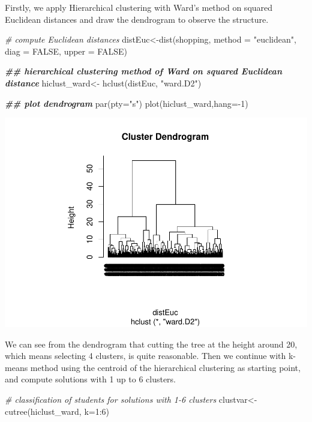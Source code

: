 \documentclass[
  11pt,
]{article}
\newenvironment{Shaded}{\begin{snugshade}}{\end{snugshade}}
\newcommand{\AttributeTok}[1]{\textcolor[rgb]{0.77,0.63,0.00}{#1}}
\newcommand{\CommentTok}[1]{\textcolor[rgb]{0.56,0.35,0.01}{\textit{#1}}}
\newcommand{\ConstantTok}[1]{\textcolor[rgb]{0.00,0.00,0.00}{#1}}
\newcommand{\DecValTok}[1]{\textcolor[rgb]{0.00,0.00,0.81}{#1}}
\newcommand{\DocumentationTok}[1]{\textcolor[rgb]{0.56,0.35,0.01}{\textbf{\textit{#1}}}}
\newcommand{\FunctionTok}[1]{\textcolor[rgb]{0.00,0.00,0.00}{#1}}
\newcommand{\NormalTok}[1]{#1}
\newcommand{\OtherTok}[1]{\textcolor[rgb]{0.56,0.35,0.01}{#1}}
\newcommand{\SpecialCharTok}[1]{\textcolor[rgb]{0.00,0.00,0.00}{#1}}
\newcommand{\StringTok}[1]{\textcolor[rgb]{0.31,0.60,0.02}{#1}}
\begin{document}
Firstly, we apply Hierarchical clustering with Ward's method on squared Euclidean distances and draw the dendrogram to observe the structure.

\begin{Shaded}
\begin{Highlighting}[]
\CommentTok{\# compute Euclidean distances}
\NormalTok{distEuc}\OtherTok{\textless{}{-}}\FunctionTok{dist}\NormalTok{(shopping, }\AttributeTok{method =} \StringTok{"euclidean"}\NormalTok{, }\AttributeTok{diag =} \ConstantTok{FALSE}\NormalTok{, }\AttributeTok{upper =} \ConstantTok{FALSE}\NormalTok{)}

\DocumentationTok{\#\#  hierarchical clustering method of Ward on squared Euclidean distance}
\NormalTok{hiclust\_ward}\OtherTok{\textless{}{-}} \FunctionTok{hclust}\NormalTok{(distEuc, }\StringTok{"ward.D2"}\NormalTok{)}

\DocumentationTok{\#\# plot dendrogram}
\FunctionTok{par}\NormalTok{(}\AttributeTok{pty=}\StringTok{"s"}\NormalTok{)}
\FunctionTok{plot}\NormalTok{(hiclust\_ward,}\AttributeTok{hang=}\SpecialCharTok{{-}}\DecValTok{1}\NormalTok{)}
\end{Highlighting}
\end{Shaded}

\includegraphics{report_files/figure-latex/Task_3_6-1.pdf}

We can see from the dendrogram that cutting the tree at the height around 20, which means selecting 4 clusters, is quite reasonable.
Then we continue with k-means method using the centroid of the hierarchical clustering as starting point, and compute solutions with 1 up to 6 clusters.

\begin{Shaded}
\begin{Highlighting}[]
\CommentTok{\# classification of students for solutions with 1{-}6 clusters}
\NormalTok{clustvar}\OtherTok{\textless{}{-}}\FunctionTok{cutree}\NormalTok{(hiclust\_ward, }\AttributeTok{k=}\DecValTok{1}\SpecialCharTok{:}\DecValTok{6}\NormalTok{)}
\end{Highlighting}
\end{Shaded}
\end{document}
